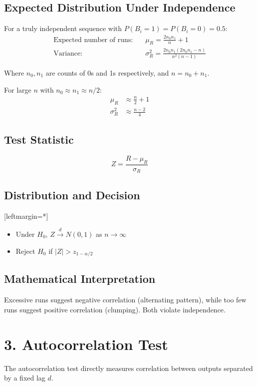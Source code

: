 \documentclass[12pt]{article}
\begin{document}
\subsection*{Expected Distribution Under Independence}
For a truly independent sequence with $P(B_i = 1) = P(B_i = 0) = 0.5$:
\begin{align*}
\text{Expected number of runs:} &\quad \mu_R = \frac{2n_0n_1}{n} + 1 \\
\text{Variance:} &\quad \sigma_R^2 = \frac{2n_0n_1(2n_0n_1 - n)}{n^2(n-1)}
\end{align*}

Where $n_0, n_1$ are counts of 0s and 1s respectively, and $n = n_0 + n_1$.

For large $n$ with $n_0 \approx n_1 \approx n/2$:
\begin{align*}
\mu_R &\approx \frac{n}{2} + 1 \\
\sigma_R^2 &\approx \frac{n-2}{4}
\end{align*}

\subsection*{Test Statistic}
\[
Z = \frac{R - \mu_R}{\sigma_R}
\]

\subsection*{Distribution and Decision}
[leftmargin=*]\begin{itemize}
    \item Under $H_0$, $Z \xrightarrow{d} N(0,1)$ as $n \to \infty$
    \item Reject $H_0$ if $|Z| > z_{1-\alpha/2}$
\end{itemize}
\subsection*{Mathematical Interpretation}
Excessive runs suggest negative correlation (alternating pattern), while too few runs suggest positive correlation (clumping). Both violate independence.

\section*{3. Autocorrelation Test}

The autocorrelation test directly measures correlation between outputs separated by a fixed lag $d$.
\end{document}
